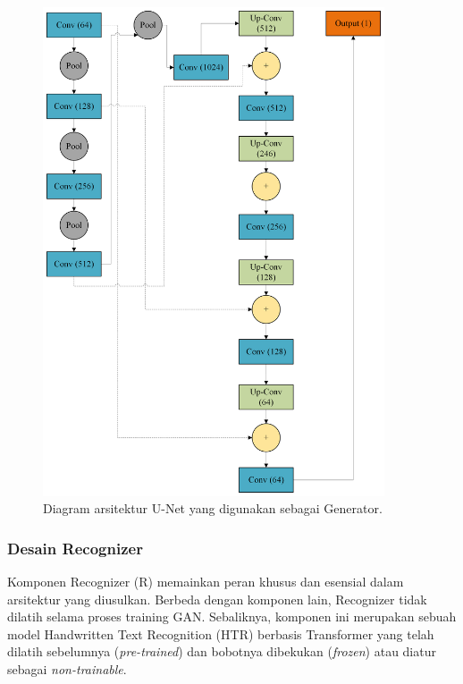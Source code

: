 \documentclass[12pt,a4paper]{article}
\begin{document}
\begin{figure}[H] %
\centering
\includegraphics[width=0.9\textwidth, height=0.45\textheight, keepaspectratio]{images/generator.png}
\caption{Diagram arsitektur U-Net yang digunakan sebagai Generator.}
\label{fig:unet_arch}
\end{figure}

\subsubsection{Desain Recognizer} %
Komponen Recognizer (R) memainkan peran khusus dan esensial dalam arsitektur yang diusulkan. Berbeda dengan komponen lain, Recognizer tidak dilatih selama proses training GAN. Sebaliknya, komponen ini merupakan sebuah model Handwritten Text Recognition (HTR) berbasis Transformer yang telah dilatih sebelumnya (\textit{pre-trained}) dan bobotnya dibekukan (\textit{frozen}) atau diatur sebagai \textit{non-trainable}.
\end{document}
